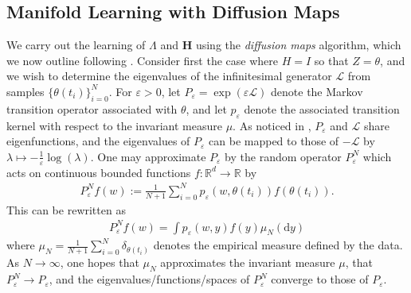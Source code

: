 \documentclass[11pt]{article}
\theoremstyle{plain}
\theoremstyle{definition}
\theoremstyle{remark}
\numberwithin{equation}{section}
\newcommand{\R}{\mathbb{R}}
\renewcommand{\L}{\mathscr{L}}
\renewcommand{\d}{\mathrm{d}}
\newcommand{\veps}{\varepsilon}
\begin{document}
\subsection{Manifold Learning with Diffusion Maps}

We carry out the learning of $\Lambda$ and $\mathbf{H}$ using the \emph{diffusion maps} algorithm, which we now outline following \citet{scholkopf_convergence_2007, von_luxburg_consistency_2008}. Consider first the case where $H=I$ so that $Z=\theta$, and we wish to determine the eigenvalues of the infinitesimal generator $\L$ from samples $\{\theta(t_i)\}_{i=0}^N$. For $\veps>0$, let $P_\veps=\exp(\veps\L)$ denote the Markov transition operator associated with $\theta$, and let $p_\veps$ denote the associated transition kernel with respect to the invariant measure $\mu$. As noticed in \citet{scholkopf_convergence_2007}, $P_\veps$ and $\L$ share eigenfunctions, and the eigenvalues of $P_\veps$ can be mapped to those of $-\L$ by $\lambda\mapsto -\frac{1}{\veps}\log(\lambda)$. One may approximate $P_\veps$ by the random operator $P_\veps^N$ which acts on continuous bounded functions $f:\R^d\to\R$ by 
\begin{align}
P_\veps^Nf(w):=\frac{1}{N+1}\sum_{i=0}^N p_\veps(w,\theta(t_i))f(\theta(t_i)).
\end{align}
This can be rewritten as 
\begin{align}
P_\veps^Nf(w)=\int p_\veps(w,y)f(y) \mu_N(\d y)
\end{align}
where $\mu_N=\frac{1}{N+1}\sum_{i=0}^N \delta_{\theta(t_i)}$ denotes the empirical measure defined by the data. As $N\to\infty$, one hopes that $\mu_N$ approximates the invariant measure $\mu$, that $P_\veps^N\to P_\veps$, and the eigenvalues/functions/spaces of $P_\veps^N$ converge to those of $P_\veps$.
\end{document}

